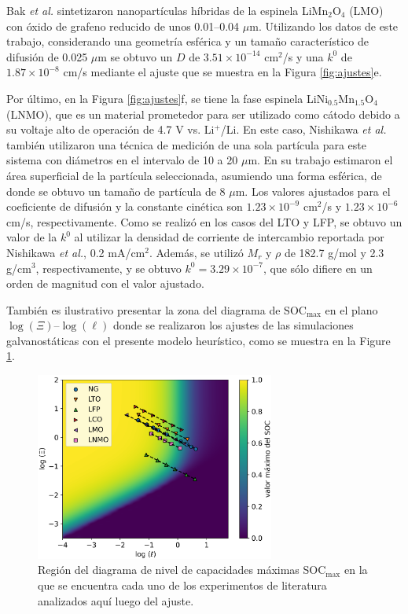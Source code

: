 Bak \textit{et al.} \cite{bak2011} sintetizaron nanopartículas híbridas de la 
espinela LiMn$_2$O$_4$ (LMO) con óxido de grafeno reducido de unos 0.01--0.04 
$\mu$m. Utilizando los datos de este trabajo, considerando una geometría esférica y un tamaño característico de 
difusión de 0.025 $\mu$m se obtuvo un $D$ de $3.51\times10^{-14}$ cm$^2$/s y una
$k^0$ de $1.87\times10^{-8}$ cm/s mediante el ajuste que se muestra en la Figura 
\ref{fig:ajustes}e.

Por último, en la Figura \ref{fig:ajustes}f, se tiene la fase espinela 
LiNi$_{0.5}$Mn$_{1.5}$O$_4$ (LNMO), que es un material prometedor para ser 
utilizado como cátodo debido a su voltaje alto de operación de 4.7 V vs. Li$^+$/Li. 
En este caso, Nishikawa \textit{et al.} \cite{nishikawa2017} también
utilizaron una técnica de medición de una sola partícula para este sistema con 
diámetros en el intervalo de 10 a 20 $\mu$m. En su trabajo estimaron el área 
superficial de la partícula seleccionada, asumiendo una forma esférica, de donde
se obtuvo un tamaño de partícula de 8 $\mu$m. Los valores ajustados para el
coeficiente de difusión y la constante cinética son $1.23\times10^{-9}$ cm$^2$/s 
y $1.23\times10^{-6}$ cm/s, respectivamente. Como se realizó en los casos del 
LTO y LFP, se obtuvo un valor de la $k^0$ al utilizar la densidad de corriente
de intercambio reportada por Nishikawa \textit{et al.}, 0.2 mA/cm$^2$. Además,
se utilizó $M_r$ y $\rho$ de 182.7 g/mol y 2.3 g/cm$^3$, respectivamente, y se
obtuvo $k^0 = 3.29\times10^{-7}$, que sólo difiere en un orden de magnitud con 
el valor ajustado.

También es ilustrativo presentar la zona del diagrama de SOC$_{\max}$ en el plano $\log(\Xi)$--$\log(\ell)$ donde se realizaron los ajustes de las simulaciones galvanostáticas con el presente modelo 
heurístico, 
como se muestra en la Figure \ref{fig:ajustes-mapa}.
\begin{figure}[h!]
    \centering
    \includegraphics[width=0.7\textwidth]{FastCharging/un/resultados/ajuste/mapa.png}
    \caption{Región del diagrama de nivel de capacidades máximas SOC$_{\max}$ en la que se encuentra cada uno de los experimentos de literatura analizados aquí
    \cite{mancini2022, he2012, lei2015, wang2019high, bak2011, nishikawa2017}
    luego del ajuste.}
    \label{fig:ajustes-mapa}
\end{figure}

